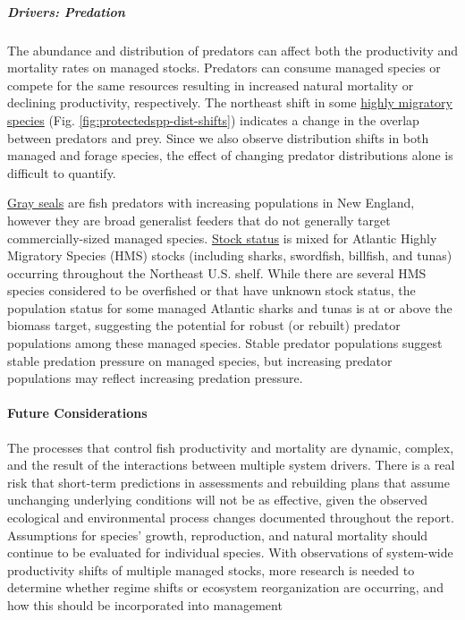 \documentclass[
  10pt,
]{article}
\begin{document}
\hypertarget{drivers-predation}{%
\subparagraph{Drivers: Predation}\label{drivers-predation}}

The abundance and distribution of predators can affect both the productivity and mortality rates on managed stocks. Predators can consume managed species or compete for the same resources resulting in increased natural mortality or declining productivity, respectively. The northeast shift in some \href{https://noaa-edab.github.io/catalog/HMS_species_distribution.html}{highly migratory species} (Fig. \ref{fig:protectedspp-dist-shifts}) indicates a change in the overlap between predators and prey. Since we also observe distribution shifts in both managed and forage species, the effect of changing predator distributions alone is difficult to quantify.

\href{https://noaa-edab.github.io/catalog/grayseal.html}{Gray seals} are fish predators with increasing populations in New England, however they are broad generalist feeders that do not generally target commercially-sized managed species. \href{https://noaa-edab.github.io/catalog/hms_stock_status.html}{Stock status} is mixed for Atlantic Highly Migratory Species (HMS) stocks (including sharks, swordfish, billfish, and tunas) occurring throughout the Northeast U.S. shelf. While there are several HMS species considered to be overfished or that have unknown stock status, the population status for some managed Atlantic sharks and tunas is at or above the biomass target, suggesting the potential for robust (or rebuilt) predator populations among these managed species. Stable predator populations suggest stable predation pressure on managed species, but increasing predator populations may reflect increasing predation pressure.

\hypertarget{future-considerations-2}{%
\paragraph{Future Considerations}\label{future-considerations-2}}

The processes that control fish productivity and mortality are dynamic, complex, and the result of the interactions between multiple system drivers. There is a real risk that short-term predictions in assessments and rebuilding plans that assume unchanging underlying conditions will not be as effective, given the observed ecological and environmental process changes documented throughout the report. Assumptions for species' growth, reproduction, and natural mortality should continue to be evaluated for individual species. With observations of system-wide productivity shifts of multiple managed stocks, more research is needed to determine whether regime shifts or ecosystem reorganization are occurring, and how this should be incorporated into management
\end{document}
